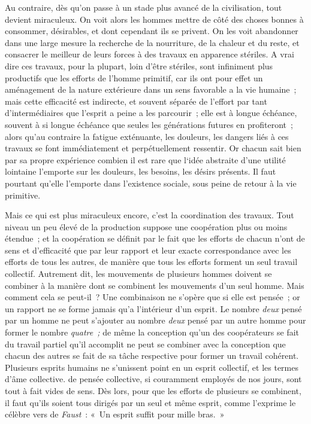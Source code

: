 \documentclass[french,twoside]{book} %
\begin{document}
Au contraire, dès qu'on passe à un stade plus avancé de la civilisation, tout devient miraculeux. On voit alors les hommes mettre de côté des choses bonnes à consommer, désirables, et dont cependant ils se privent. On les voit abandonner dans une large mesure la recherche de la nourriture, de la chaleur et du reste, et consacrer le meilleur de leurs forces à des travaux en apparence stériles. A vrai dire ces travaux, pour la plupart, loin d'être stériles, sont infiniment plus productifs que les efforts de l'homme primitif, car ils ont pour effet un aménagement de la nature extérieure dans un sens favorable a la vie humaine ; mais cette efficacité est indirecte, et souvent séparée de l'effort par tant d'intermédiaires que l'esprit a peine a les parcourir ; elle est à longue échéance, souvent à si longue échéance que seules les générations futures en profiteront ; alors qu'au contraire la fatigue exténuante, les douleurs, les dangers liés à ces travaux se font immédiatement et perpétuellement ressentir. Or chacun sait bien par sa propre expérience combien il est rare que l‘idée abstraite d'une utilité lointaine l'emporte sur les douleurs, les besoins, les désirs présents. Il faut pourtant qu'elle l'emporte dans l'existence sociale, sous peine de retour à la vie primitive.\par
Mais ce qui est plus miraculeux encore, c'est la coordination des travaux. Tout niveau un peu élevé de la production suppose une coopération plus ou moins étendue ; et la coopération se définit par le fait que les efforts de chacun n'ont de sens et d'efficacité que par leur rapport et leur exacte correspondance avec les efforts de tous les autres, de manière que tous les efforts forment un seul travail collectif. Autrement dit, les mouvements de plusieurs hommes doivent se combiner à la manière dont se combinent les mouvements d'un seul homme. Mais comment cela se peut-il ? Une combinaison ne s'opère que si elle est pensée ; or un rapport ne se forme jamais qu'a l'intérieur d'un esprit. Le nombre {\itshape deux} pensé par un homme ne peut s'ajouter au nombre {\itshape deux} pensé par un autre homme pour former le nombre {\itshape quatre ;} de même la conception qu'un des coopérateurs se fait du travail partiel qu'il accomplit ne peut se combiner avec la conception que chacun des autres se fait de sa tâche respective pour former un travail cohérent. Plusieurs esprits humains ne s'unissent point en un esprit collectif, et les termes d'âme collective. de pensée collective, si couramment employés de nos jours, sont tout à fait vides de sens. Dès lors, pour que les efforts de plusieurs se combinent, il faut qu'ils soient tous dirigés par un seul et même esprit, comme l'exprime le célèbre vers de {\itshape Faust} : « Un esprit suffit pour mille bras. »\par
\end{document}
